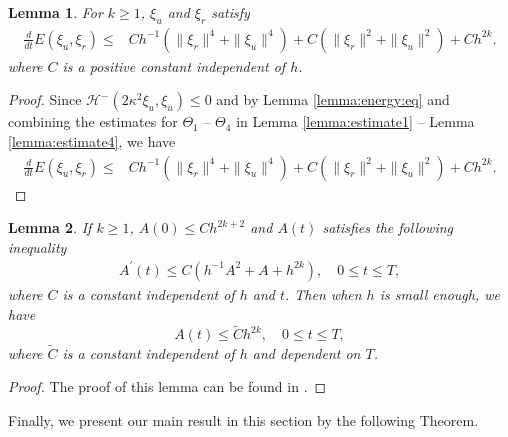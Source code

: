 \documentclass[11pt]{article}
\newcommand{\Hcal} {\mathcal{H}}
\newtheorem{lemma}{Lemma}[section]
\numberwithin{equation}{section}
\begin{document}
\begin{lemma}\label{lemma:estimate6} %
For $k\geq1$, $\xi_u$ and $\xi_r$ satisfy
\begin{align}\label{eq:estimate6}
\frac{d}{dt}E(\xi_u, \xi_r)\leq  &Ch^{-1}(\|\xi_r\|^4+\|\xi_u\|^4)+C(\|\xi_r\|^2+\|\xi_u\|^2)+Ch^{2k}.
\end{align}
where $C$ is a positive constant independent of $h$.
\end{lemma}
\begin{proof}
Since $\Hcal^-(2\kappa^2\xi_u, \xi_u)\leq 0$ and by Lemma \ref{lemma:energy:eq} and combining the estimates for $\Theta_1$ -- $\Theta_4$ in Lemma \ref{lemma:estimate1} -- Lemma \ref{lemma:estimate4}, we have
\begin{align*}
\frac{d}{dt}E(\xi_u, \xi_r)\leq  &Ch^{-1}(\|\xi_r\|^4+\|\xi_u\|^4)+C(\|\xi_r\|^2+\|\xi_u\|^2)+Ch^{2k}.
\end{align*}
\end{proof}


\begin{lemma}\label{lemma:est:A}
If $k\geq 1$, $A(0)\leq Ch^{2k+2}$ and $A(t)$ satisfies the following inequality
  \begin{align}\label{ine:ch:3}
   A^\prime(t)\le C(h^{-1}A^2+A+h^{2k}), \quad 0\leq t \leq T,
   \end{align}
where $C$ is a constant independent of $h$ and $t$. Then when $h$ is small enough, we have
$$A(t)\le \tilde{C}h^{2k}, \quad 0\leq t \leq T,$$
where $\tilde{C}$ is a constant independent of $h$ and dependent on $T$.
\end{lemma}
\begin{proof}
The proof of this lemma can be found in \cite{Tao2025MC}.
\end{proof}
Finally, we present our main result in this section by the following Theorem.
\end{document}
